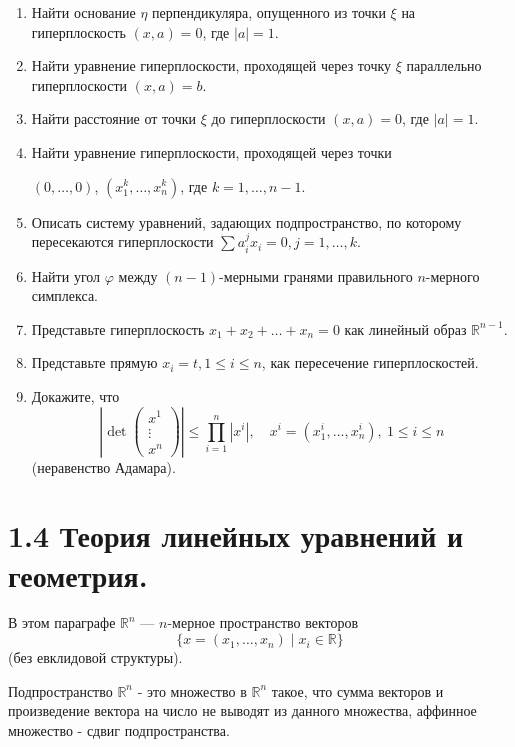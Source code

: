 	\begin{enumerate}
		\item Найти основание $\eta$ перпендикуляра, опущенного из точки $\xi$ на гиперплоскость $(x, a) = 0$, где $|a|=1$.

		\item Найти уравнение гиперплоскости, проходящей через точку $\xi$ параллельно гиперплоскости $(x, a) = b$.

		\item Найти расстояние от точки $\xi$ до гиперплоскости $(x, a) = 0$, где $|a|=1$.

		\item Найти уравнение гиперплоскости, проходящей через точки

			$(0,\dots,0)$, $(x^k_1, \dots, x^k_n)$, где $k=1,\dots,n-1$.

		\item Описать систему уравнений, задающих подпространство, по которому пересекаются гиперплоскости $\sum a^j_i x_i = 0, j=1,\dots,k$.

		\item Найти угол $\varphi$ между $(n-1)$-мерными гранями правильного $n$-мерного симплекса.

		\item Представьте гиперплоскость $x_1 + x_2 + \dots + x_n = 0$ как линейный образ $\mathbb{R}^{n-1}$.

		\item Представьте прямую $x_i = t, 1 \le i \le n$, как пересечение гиперплоскостей.

		\item Докажите, что
		\[
			\left| \det \begin{pmatrix}
				x^1 \\ \vdots \\ x^n
			\end{pmatrix} \right| \le \prod_{i=1}^n |x^i|, \quad x^i = (x^i_1, \dots, x^i_n), \ 1 \le i \le n
		\]
		(неравенство Адамара).
	\end{enumerate}
	\newpage

	\section{1.4 Теория линейных уравнений и геометрия.}

	В этом параграфе $\mathbb{R}^n$ — $n$-мерное пространство векторов 
	\[ 
		\{x=(x_1, \dots, x_n) \mid x_i \in \mathbb{R}\}
	\]
	(без евклидовой структуры).

	Подпространство $\mathbb{R}^n$ - это множество в $\mathbb{R}^n$ такое, что сумма векторов и произведение вектора на число не выводят из данного множества, аффинное множество - сдвиг подпространства.

